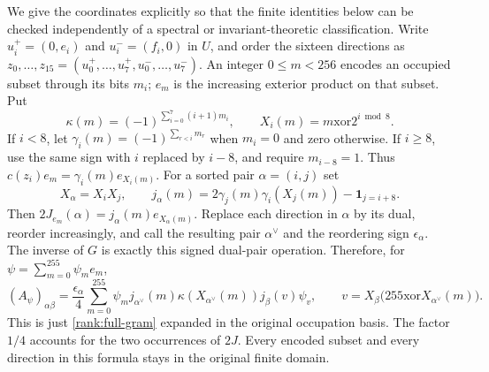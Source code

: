 We give the coordinates explicitly so that the finite identities below
can be checked independently of a spectral or invariant-theoretic
classification. Write $u_i^+=(0,e_i)$ and $u_i^-=(f_i,0)$ in $U$, and
order the sixteen directions as
$z_0,\ldots,z_{15}=(u_0^+,\ldots,u_7^+,u_0^-,\ldots,u_7^-)$.
An integer $0\le m<256$ encodes an occupied subset through its bits $m_i$;
$e_m$ is the increasing exterior product on that subset. Put
\[
 \kappa(m)=(-1)^{\sum_{i=0}^7(i+1)m_i},\qquad
 X_i(m)=m\mathbin{\mathrm{xor}}2^{i\bmod8}.
\]
If $i<8$, let $\gamma_i(m)=(-1)^{\sum_{r<i}m_r}$ when $m_i=0$ and zero
otherwise. If $i\ge8$, use the same sign with $i$ replaced by $i-8$, and
require $m_{i-8}=1$. Thus $c(z_i)e_m=\gamma_i(m)e_{X_i(m)}$.
For a sorted pair $\alpha=(i,j)$ set
\[
 X_\alpha=X_iX_j,\qquad
 j_\alpha(m)=2\gamma_j(m)\gamma_i(X_j(m))
                   -\mathbf1_{j=i+8}.
\]
Then $2J_{e_m}(\alpha)=j_\alpha(m)e_{X_\alpha(m)}$.
Replace each direction in $\alpha$ by its dual, reorder increasingly,
and call the resulting pair $\alpha^\vee$ and the reordering sign
$\epsilon_\alpha$. The inverse of $G$ is exactly this signed dual-pair
operation. Therefore, for $\psi=\sum_{m=0}^{255}\psi_me_m$,
\begin{equation}
 (A_\psi)_{\alpha\beta}
 =\frac{\epsilon_\alpha}{4}\sum_{m=0}^{255}
 \psi_m j_{\alpha^\vee}(m)\kappa(X_{\alpha^\vee}(m))
 j_\beta(v)\psi_v,\qquad
 v=X_\beta\bigl(255\mathbin{\mathrm{xor}}X_{\alpha^\vee}(m)\bigr).
 \label{rank:entry-formula}
\end{equation}
This is just \eqref{rank:full-gram} expanded in the original occupation
basis. The factor $1/4$ accounts for the two occurrences of $2J$.
Every encoded subset and every direction in this formula stays in the original
finite domain.

